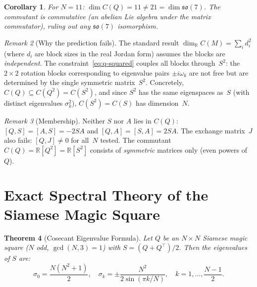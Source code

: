 \documentclass[aps,prd,twocolumn,superscriptaddress,floatfix,nofootinbib]{revtex4-2}
\newtheorem{theorem}{Theorem}
\newtheorem{corollary}[theorem]{Corollary}
\theoremstyle{definition}
\theoremstyle{remark}
\newtheorem{remark}[theorem]{Remark}
\begin{document}
\begin{corollary}\label{cor:no-so7}
  For $N=11$: $\dim C(Q) = 11 \neq 21 = \dim\mathfrak{so}(7)$.
  The commutant is commutative (an abelian Lie algebra under the
  matrix commutator), ruling out any $\mathfrak{so}(7)$ isomorphism.
\end{corollary}

\begin{remark}[Why the prediction fails]
  The standard result $\dim_{\mathbb{R}} C(M) = \sum_i d_i^2$
  (where $d_i$ are block sizes in the real Jordan form) assumes
  the blocks are \emph{independent}. The constraint~\eqref{eq:q-squared}
  couples all blocks through~$S^2$: the $2\times 2$ rotation blocks
  corresponding to eigenvalue pairs $\pm i\omega_k$ are not free
  but are determined by the single symmetric matrix~$S^2$.
  Concretely, $C(Q) \subseteq C(Q^2) = C(S^2)$, and since $S^2$
  has the same eigenspaces as~$S$ (with distinct eigenvalues $\sigma_k^2$),
  $C(S^2) = C(S)$ has dimension~$N$.
\end{remark}

\begin{remark}[Membership]
  Neither $S$ nor $A$ lies in $C(Q)$:
  $[Q,S] = [A,S] = -2SA$ and $[Q,A] = [S,A] = 2SA$.
  The exchange matrix~$J$ also fails: $[Q,J] \neq 0$ for all~$N$ tested.
  The commutant $C(Q) = \mathbb{R}[Q^2] = \mathbb{R}[S^2]$
  consists of \emph{symmetric} matrices only (even powers of~$Q$).
\end{remark}

\section{Exact Spectral Theory of the Siamese Magic Square}
\label{sec:exact-spectral}

\begin{theorem}[Cosecant Eigenvalue Formula]
\label{thm:cosecant}
Let $Q$ be an $N \times N$ Siamese magic square ($N$ odd, $\gcd(N,3)=1$) with
$S = (Q+Q^\top)/2$. Then the eigenvalues of $S$ are:
\begin{equation}\label{eq:cosecant-eigenvalues}
\sigma_0 = \frac{N(N^2+1)}{2}, \quad
\sigma_k = \pm \frac{N^2}{2\sin(\pi k/N)}, \quad k = 1, \ldots, \frac{N-1}{2}.
\end{equation}
\end{theorem}
\end{document}
